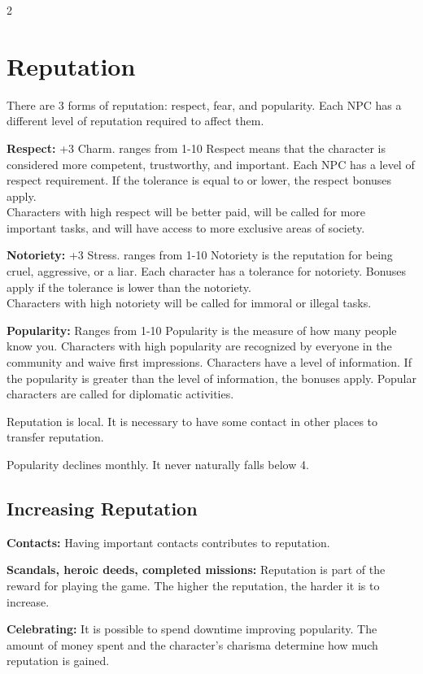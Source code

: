 \begin{multicols}{2}
\section{Reputation}

There are 3 forms of reputation: respect, fear, and popularity. Each NPC has a different level of reputation required to affect them.

\textbf{Respect:} +3 Charm. ranges from 1-10
Respect means that the character is considered more competent, trustworthy, and important. Each NPC has a level of respect requirement. If the tolerance is equal to or lower, the respect bonuses apply. \\
Characters with high respect will be better paid, will be called for more important tasks, and will have access to more exclusive areas of society.

\textbf{Notoriety:} +3 Stress. ranges from 1-10
Notoriety is the reputation for being cruel, aggressive, or a liar. Each character has a tolerance for notoriety. Bonuses apply if the tolerance is lower than the notoriety. \\
Characters with high notoriety will be called for immoral or illegal tasks.

\textbf{Popularity:}  Ranges from 1-10
Popularity is the measure of how many people know you. Characters with high popularity are recognized by everyone in the community and waive first impressions. Characters have a level of information. If the popularity is greater than the level of information, the bonuses apply.
Popular characters are called for diplomatic activities.

Reputation is local. It is necessary to have some contact in other places to transfer reputation.

Popularity declines monthly. It never naturally falls below 4.

\subsection{Increasing Reputation}

\textbf{Contacts:} Having important contacts contributes to reputation.

\textbf{Scandals, heroic deeds, completed missions:} Reputation is part of the reward for playing the game. The higher the reputation, the harder it is to increase.

\textbf{Celebrating:} It is possible to spend downtime improving popularity. The amount of money spent and the character's charisma determine how much reputation is gained.


\end{multicols}
